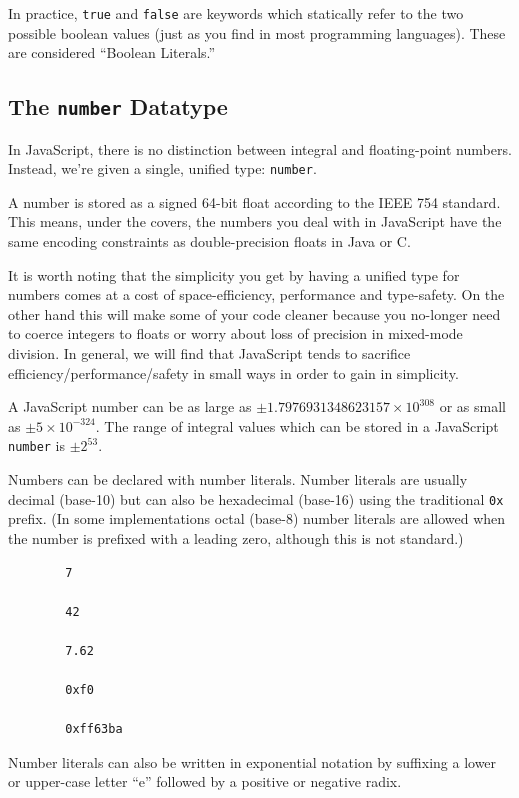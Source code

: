 \documentclass[11pt,letter]{book}
\begin{document}
    In practice, \texttt{true} and \texttt{false} are keywords which statically refer to the two 
    possible boolean values (just as you find in most programming languages). These are considered 
    ``Boolean Literals.''
    
    \subsection{The \texttt{number} Datatype}
    In JavaScript, there is no distinction between integral and floating-point numbers. Instead, 
    we're given a single, unified type: \texttt{number}.
    
    A number is stored as a signed 64-bit float according to the IEEE 754 standard. This means, 
    under the covers, the numbers you deal with in JavaScript have the same encoding constraints as 
    double-precision floats in Java or C.
    
    It is worth noting that the simplicity you get by having a unified type for numbers comes at 
    a cost of space-efficiency, performance and type-safety. On the other hand this will make 
    some of your code cleaner because you no-longer need to coerce integers to floats or 
    worry about loss of precision in mixed-mode division. In general, we will find that 
    JavaScript tends to sacrifice efficiency/performance/safety in small ways in order to gain 
    in simplicity.
    
    A JavaScript number can be as large as $\pm 1.7976931348623157 \times 10^{308}$ or as small as
    $\pm 5 \times 10^{-324}$. The range of integral values which can be stored in a JavaScript 
    \texttt{number} is $\pm 2^{53}$.
    
    Numbers can be declared with number literals. Number literals are usually decimal (base-10) but 
    can also be hexadecimal (base-16) using the traditional \texttt{0x} prefix. (In some 
    implementations octal (base-8) number literals are allowed when the number is prefixed with a 
    leading zero, although this is not standard.)
    
    \begin{verbatim}
        7
    
        42
        
        7.62
        
        0xf0
    
        0xff63ba
    \end{verbatim}
    
    Number literals can also be written in exponential notation by suffixing a lower or upper-case 
    letter ``e'' followed by a positive or negative radix. 
    
\end{document}

